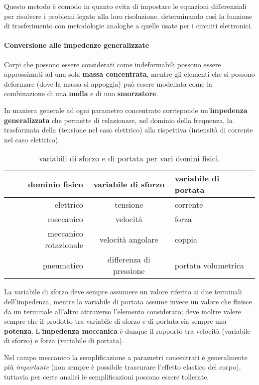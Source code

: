 	Questo metodo è comodo in quanto evita di impostare le equazioni differenziali per risolvere i problemi legato alla loro risoluzione, determinando così la funzione di trasferimento con metodologie analoghe a quelle usate per i circuiti elettronici.
	
	\paragraph{Conversione alle impedenze generalizzate} Corpi che possono essere considerati come indeformabili possono essere approssimati ad una sola \textbf{massa concentrata}, mentre gli elementi che si possono deformare (dove la massa si appoggia) può essere modellata come la combinazione di una \textbf{molla} e di uno \textbf{smorzatore}.
	
	In maniera generale ad ogni parametro concentrato corrisponde un'\textbf{impedenza generalizzata} che permette di relazionare, nel dominio della frequenza, la trasformata della  (tensione nel caso elettrico) alla rispettiva  (intensità di corrente nel caso elettrico).
	
	\begin{table}[bht]
		\centering
		\begin{tabular}{r|c|l}
			\textbf{dominio fisico} & \textbf{variabile di sforzo} & \textbf{variabile di portata} \\ \hline
			elettrico & tensione & corrente \\
			meccanico & velocità & forza \\
			meccanico rotazionale & velocità angolare & coppia \\ 
			pneumatico & differenza di pressione & portata volumetrica
		\end{tabular}
		\caption{variabili di sforzo e di portata per vari domini fisici.}
	\end{table}

	La variabile di sforzo deve sempre assumere un valore riferito ai due terminali dell'impedenza, mentre la variabile di portata assume invece un valore che fluisce da un terminale all'altro attraverso l'elemento considerato; deve inoltre valere sempre che il prodotto tra variabile di sforzo e di portata sia sempre una \textbf{potenza}. L'\textbf{impedenza meccanica} è dunque il rapporto tra velocità (variabile di sforzo) e forza (variabile di portata).
	
	Nel campo meccanico la semplificazione a parametri concentrati è generalmente più \textit{importante} (non sempre è possibile trascurare l'effetto elastico del corpo), tuttavia per certe analisi le semplificazioni possono essere tollerate.
	
